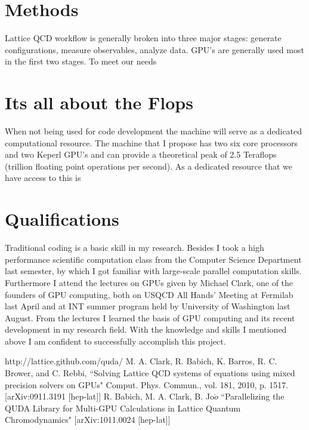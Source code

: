 \documentclass[11pt]{article}
\begin{document}
  \section*{Methods} %
  Lattice QCD workflow is generally broken into three major stages:  generate configurations, measure observables, analyze data.
  GPU's are generally used most in the first two stages.  
  To meet our needs

  
  \section*{Its all about the Flops} %
  When not being used for code development the machine will serve as a dedicated computational resource.  
  The machine that I propose has two six core processors and two Keperl GPU's and can provide a theoretical peak of 2.5 Teraflops (trillion floating point operations per second).  
  As a dedicated resource that we have access to this is 

  \section*{Qualifications} %
  Traditional coding is a basic skill in my research. 
  Besides I took a high performance scientific computation class from the Computer Science Department last semester, by which I got familiar with large-scale parallel computation skills. 
  Furthermore I attend the lectures on GPUs given by Michael Clark, one of the founders of GPU computing, both on USQCD All Hands' Meeting at Fermilab last April and at INT summer program held by University of Washington last August. 
  From the lectures I learned the basis of GPU computing and its recent development in my research field. With the knowledge and skills I mentioned above I am confident to successfully accomplish this project.

%
\begin{thebibliography}{99}
http://lattice.github.com/quda/
M. A. Clark, R. Babich, K. Barros, R. C. Brower, and C. Rebbi,
``Solving Lattice QCD systems of equations using mixed precision solvers on GPUs" Comput. Phys. Commun., vol. 181, 2010, p. 1517. [arXiv:0911.3191 
[hep-lat]]
R. Babich, M. A. Clark, B. Jo$\acute{o}$ ``Parallelizing the QUDA Library for Multi-GPU Calculations in Lattice Quantum Chromodynamics" [arXiv:1011.0024 
[hep-lat]]

\end{thebibliography}
\end{document}
